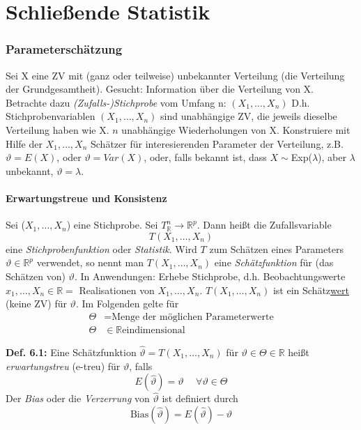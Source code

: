 \documentclass[a4paper,11pt]{article}
\begin{document}
\part{Schließende Statistik}

\section{Parameterschätzung}
Sei X eine ZV mit (ganz oder teilweise) unbekannter Verteilung (die Verteilung der Grundgesamtheit). 
\newline Gesucht: Information über die Verteilung von X. 
\newline Betrachte dazu \textit{(Zufalls-)Stichprobe} vom Umfang n: $(X_1,\dots,X_n)$ D.h. Stichprobenvariablen $(X_1,\dots,X_n)$ sind unabhängige ZV, die jeweils dieselbe Verteilung haben wie X. 
\newline $n$ unabhängige Wiederholungen von X. 
\newline Konstruiere mit Hilfe der $X_1,\dots,X_n$ Schätzer für interesierenden Parameter der Verteilung, z.B. $\vartheta=E(X)$, oder $\vartheta=Var(X)$, oder, falls bekannt ist, dass $X\sim$Exp($\lambda$), aber $\lambda$ unbekannt, $\vartheta=\lambda$. 

\subsection{Erwartungstreue und Konsistenz}
Sei ($X_1,\dots,X_n$) eine Stichprobe. Sei $T_\mathbb{R}^n\rightarrow\mathbb{R}^p$. Dann heißt die Zufallsvariable
\[T(X_1,\dots,X_n)\]
eine \textit{Stichprobenfunktion} oder \textit{Statistik}. Wird $T$ zum Schätzen eines Parameters $\vartheta\in\mathbb{R}^p$ verwendet, so nennt man $T(X_1,\dots,X_n)$ eine \textit{Schätzfunktion} für (das Schätzen von) $\vartheta$. 
\newline In Anwendungen: Erhebe Stichprobe, d.h. Beobachtungswerte $x_1,\dots,X_n\in\mathbb{R} =$ Realisationen von $X_1,\dots,X_n$. 
\newline $T(X_1,\dots,X_n)$ ist ein Schätz\underline{wert} (keine ZV) für $\vartheta$. 
\newline Im Folgenden gelte für 
\begin{align*}
\Theta &= \text{Menge der möglichen Parameterwerte}\\
\Theta &\in \mathbb{R} \text{eindimensional}
\end{align*}

\vspace{6pt}
\noindent\textbf{Def. 6.1:} 
Eine Schätzfunktion $\hat{\vartheta} = T(X_1,\dots,X_n)$ für $\vartheta\in\Theta\in\mathbb{R}$ heißt \textit{erwartungstreu} (e-treu) für $\vartheta$, falls
\[E(\hat{\vartheta})=\vartheta \hspace{15pt}\forall\vartheta\in\Theta\]
Der \textit{Bias} oder die \textit{Verzerrung} von $\hat{\vartheta}$ ist definiert durch
\[\text{Bias}(\hat{\vartheta})=E(\hat{\vartheta})-\vartheta\]
\end{document}
